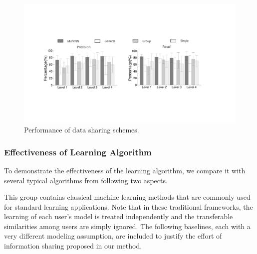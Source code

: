 \begin{figure}[h]
  \centering
  \includegraphics[width=0.8\columnwidth]{./img/performance_of_multi_division.pdf}
  \caption{Performance of data sharing schemes. }
  \label{fig:cmp_multi_division}
\end{figure}


\subsubsection{Effectiveness of \modelname Learning Algorithm}
\label{subsec:model_compare}
To demonstrate the effectiveness of the \modelname learning algorithm, we compare it with several typical algorithms from following two aspects.

This group contains classical machine learning methods that are commonly used for standard learning applications. Note that in these traditional frameworks, the learning of each user's model is treated independently and the transferable similarities among users are simply ignored. The following baselines, each with a very different modeling assumption, are included to justify the effort of information sharing proposed in our method.

